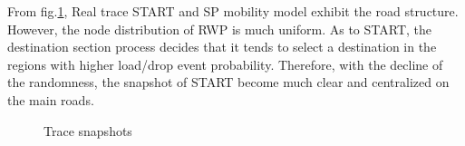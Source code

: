 From fig.\ref{figure_trace_snapshots}, Real trace START and SP mobility model exhibit the road structure. However, the node distribution of RWP is much uniform.
As to START, the destination section process decides that it tends to select a destination in the regions with higher load/drop event probability.
Therefore, with the decline of the randomness, the snapshot of START become much clear and centralized on the main roads.
\begin{figure}[!h]
\centering
{}
\vspace{0.in}
\hspace{0.0in}
\vspace{0.in}
\hspace{0.0in}
\vspace{0.in}
\hspace{0.0in}
\caption{Trace snapshots}\label{figure_trace_snapshots}
\end{figure}



